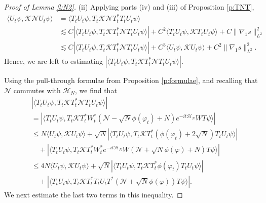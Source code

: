 \documentclass[11pt,a4paper]{scrartcl}
\newcommand{\N}{\mathcal{N}}
\newcommand{\K}{\mathcal{K}}
\begin{document}
\begin{proof}[Proof of Lemma \ref{l:N2}]
  (ii) Applying parts (iv) and (iii) of Proposition \ref{p:TNT},
  \begin{equation}
    \label{nk1}
    \begin{split}
      \langle U_t \psi, \K \N U_t \psi \rangle & = \langle T_t U_t \psi, T_t
      \K \N T_t^* T_t U_t \psi \rangle \\
      & \apprle C | \langle T_t U_t \psi, T_t \K T_t^* \N T_t U_t \psi \rangle
      | + C^2 \langle T_t U_t \psi, \K T_t U_t \psi \rangle + C \| \nabla_1 s
      \|_{L^2}^2 \\
      & \apprle C | \langle T_t U_t \psi, T_t \K T_t^* \N T_t U_t \psi \rangle
      | + C^3 \langle U_t \psi, \K U_t \psi \rangle + C^2 \| \nabla_1 s
      \|_{L^2}^2.
    \end{split}
  \end{equation}
  Hence, we are left to estimating $| \langle T_t U_t \psi, T_t \K T_t^* \N
  T_t U_t \psi \rangle |$.


  Using the pull-through formulae from Proposition \ref{p:formulae}, and
  recalling that $\N$ commutes with $\mathcal{H}_N$, we find that
  \begin{equation}
    \label{nk2}
    \begin{split}
      & | \langle T_t U_t \psi, T_t \K T_t^* \N T_t U_t \psi \rangle | \\
      & = | \langle T_t U_t \psi, T_t \K T_t^* W_t^* (\N - \sqrt{N}
      \phi(\varphi_t) + N) e^{-it \mathcal{H}_N} WT \psi \rangle | \\
      & \le N \langle U_t \psi, \K U_t \psi \rangle + \sqrt{N} | \langle T_t
      U_t \psi, T_t \K T_t^* ( \phi(\varphi_t) + 2 \sqrt{N} ) T_t U_t \psi
      \rangle | \\
      & \quad + | \langle T_t U_t \psi, T_t \K T_t^* W_t^* e^{-it
      \mathcal{H}_N} W (\N + \sqrt{N} \phi(\varphi) + N) T \psi \rangle | \\
      & \le 4 N \langle U_t \psi, \K U_t \psi \rangle + \sqrt{N} | \langle T_t
      U_t \psi, T_t \K T_t^* \phi(\varphi_t) T_t U_t \psi \rangle | \\
      & \quad + | \langle T_t U_t \psi, T_t \K T_t^* T_t U_t T^* (\N +
      \sqrt{N} \phi(\varphi) ) T \psi \rangle|.
    \end{split}
  \end{equation}
  We next estimate the last two terms in this inequality.



\end{proof}
\end{document}
